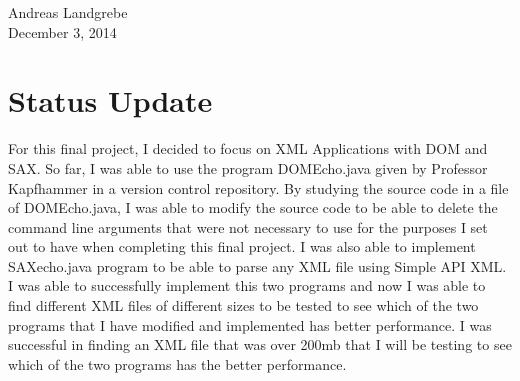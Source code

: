 \documentclass{article}
\begin{document}
\noindent
Andreas Landgrebe
\\
December 3, 2014
\section{Status Update}
\par
\indent
For this final project, I decided to focus on XML Applications with DOM and SAX. So far, I was able to use the program DOMEcho.java given by Professor Kapfhammer in a version control repository. By studying the source code in a file of DOMEcho.java, I was able to modify the source code to be able to delete the command line arguments that were not necessary to use for the purposes I set out to have when completing this final project. I was also able to implement SAXecho.java program to be able to parse any XML file using Simple API XML. I was able to successfully implement this two programs and now I was able to find different XML files of different sizes to be tested to see which of the two programs that I have modified and implemented has better performance. I was successful in finding an XML file that was over 200mb that I will be testing to see which of the two programs has the better performance. 
\end{document}
